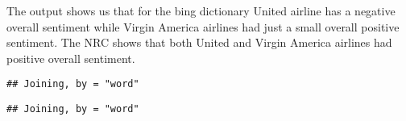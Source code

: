 \documentclass[
]{article}
\newenvironment{Shaded}{\begin{snugshade}}{\end{snugshade}}
\newcommand{\CommentTok}[1]{\textcolor[rgb]{0.56,0.35,0.01}{\textit{#1}}}
\newcommand{\DataTypeTok}[1]{\textcolor[rgb]{0.13,0.29,0.53}{#1}}
\newcommand{\KeywordTok}[1]{\textcolor[rgb]{0.13,0.29,0.53}{\textbf{#1}}}
\newcommand{\NormalTok}[1]{#1}
\newcommand{\OperatorTok}[1]{\textcolor[rgb]{0.81,0.36,0.00}{\textbf{#1}}}
\newcommand{\StringTok}[1]{\textcolor[rgb]{0.31,0.60,0.02}{#1}}
\begin{document}
The output shows us that for the bing dictionary United airline has a
negative overall sentiment while Virgin America airlines had just a
small overall positive sentiment. The NRC shows that both United and
Virgin America airlines had positive overall sentiment.

\begin{Shaded}
\end{Shaded}

\begin{verbatim}
## Joining, by = "word"
\end{verbatim}

\begin{Shaded}
\end{Shaded}

\begin{verbatim}
## Joining, by = "word"
\end{verbatim}
\end{document}
